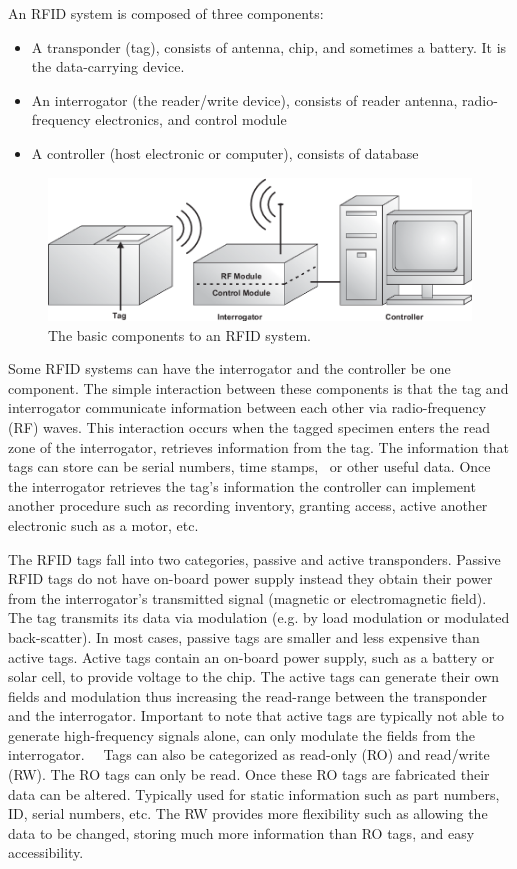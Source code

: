
An RFID system is composed of three components:
\begin{itemize}
    \item A transponder (tag), consists of antenna, chip, and sometimes a battery. It is the data-carrying device.
    \item An interrogator (the reader/write device), consists of reader antenna, radio-frequency electronics, and control module
    \item A controller (host electronic or computer), consists of database 
\end{itemize}


\begin{figure}[htp]
    \centering
    \includegraphics[scale=0.45]{Figs/RFID_Blocks.png}
    \caption{The basic components to an RFID system. \cite{laran2004basic}}
    \label{fig:RFIDBlocks}
\end{figure}


Some RFID systems can have the interrogator and the controller be one component. The simple interaction between these components is that the tag and interrogator communicate information between each other via radio-frequency (RF) waves. This interaction occurs when the tagged specimen enters the read zone of the interrogator, retrieves information from the tag. The information that tags can store can be serial numbers, time stamps,  or other useful data. Once the interrogator retrieves the tag's information the controller can implement another procedure such as recording inventory, granting access, active another electronic such as a motor, etc. 

The RFID tags fall into two categories, passive and active transponders. Passive RFID tags do not have on-board power supply instead they obtain their power from the interrogator's transmitted signal (magnetic or electromagnetic field). The tag transmits its data via modulation (e.g. by load modulation or modulated back-scatter). In most cases, passive tags are smaller and less expensive than active tags. Active tags contain an on-board power supply, such as a battery or solar cell, to provide voltage to the chip. The active tags can generate their own fields and modulation thus increasing the read-range between the transponder and the interrogator. Important to note that active tags are typically not able to generate high-frequency signals alone, can only modulate the fields from the interrogator.    
Tags can also be categorized as read-only (RO) and read/write (RW). The RO tags can only be read. Once these RO tags are fabricated their data can be altered. Typically used for static information such as part numbers, ID, serial numbers, etc. The RW provides more flexibility such as allowing the data to be changed, storing much more information than RO tags, and easy accessibility.   

